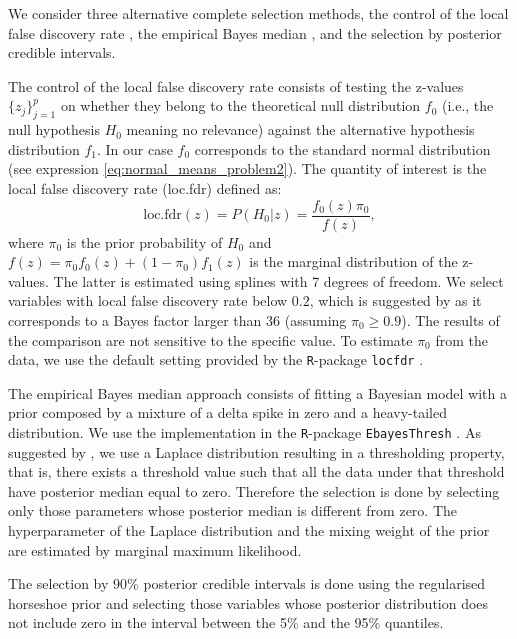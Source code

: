 \documentclass[a4]{article}
\theoremstyle{definition}
\begin{document}
We consider three alternative complete selection methods,
 the control of the local
false discovery rate \citep{paper:efron, efron2012large}, the
empirical Bayes median \citep{johnstone2004needles}, and the selection
by posterior credible intervals.

The control of the local false discovery rate consists of testing the
z-values $\{z_{j}\}_{j=1}^{p}$ on whether they belong to the
theoretical null distribution $f_{0}$ (i.e., the null hypothesis $H_0$
meaning no relevance) against the alternative hypothesis distribution
$f_{1}$. In our case $f_{0}$ corresponds to the standard normal
distribution (see expression \eqref{eq:normal_means_problem2}). The
quantity of interest is the local false discovery rate (loc.fdr)
defined as: \
\begin{equation}
\text{loc.fdr}(z)=P(H_{0}|z)=\frac{f_{0}(z)\pi_{0}}{f(z)},
\end{equation}
where $\pi_{0}$ is the prior probability of $H_0$ and
$f(z)=\pi_{0}f_{0}(z)+(1-\pi_{0})f_{1}(z)$ is the marginal
distribution of the z-values. The latter is estimated using splines
with 7 degrees of freedom. We select variables with local false
discovery rate below $0.2$, which is suggested by
\citet{efron2012large} as it corresponds to a Bayes factor larger than
36 (assuming $\pi_{0}\geq0.9$). The results of the comparison are not
sensitive to the specific value. To estimate $\pi_{0}$ from the data,
we use the default setting provided by the \texttt{R}-package
\texttt{locfdr} \citep{Efron+Turnbull+Narasimhan:2015:locfdr}.

The empirical Bayes median approach consists of fitting a Bayesian
model with a prior composed by a mixture of a delta spike in zero and
a heavy-tailed distribution. We use the implementation in the
\texttt{R}-package \texttt{EbayesThresh}
\citep{Silverman+etal:2017:EbayesThresh}. As suggested by
\cite{johnstone2004needles}, we use a Laplace distribution resulting
in a thresholding property, that is, there exists a threshold value
such that all the data under that threshold have posterior median
equal to zero. Therefore the selection is done by selecting only those
parameters whose posterior median is different from zero. The
hyperparameter of the Laplace distribution and the mixing weight of
the prior are estimated by marginal maximum likelihood.

The selection
by 90\% posterior credible intervals is done using the regularised
horseshoe prior \Citep{paper:rhs} and selecting those variables whose posterior
distribution does not include zero in the interval between the 5\% and
the 95\% quantiles.
\end{document}
